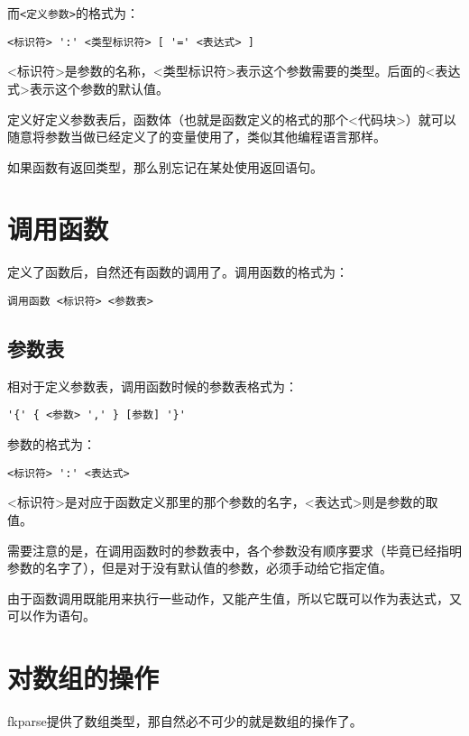 而\verb|<定义参数>|的格式为：

\begin{verbatim}
<标识符> ':' <类型标识符> [ '=' <表达式> ]
\end{verbatim}

<标识符>是参数的名称，<类型标识符>表示这个参数需要的类型。后面的<表达式>表示这个参数的默认值。

定义好定义参数表后，函数体（也就是函数定义的格式的那个<代码块>）就可以随意将参数当做已经定义了的变量使用了，类似其他编程语言那样。

如果函数有返回类型，那么别忘记在某处使用返回语句。

\section{调用函数}

定义了函数后，自然还有函数的调用了。调用函数的格式为：

\begin{verbatim}
调用函数 <标识符> <参数表>
\end{verbatim}

\subsection{参数表}

相对于定义参数表，调用函数时候的参数表格式为：

\begin{verbatim}
'{' { <参数> ',' } [参数] '}'
\end{verbatim}

参数的格式为：

\begin{verbatim}
<标识符> ':' <表达式>
\end{verbatim}

<标识符>是对应于函数定义那里的那个参数的名字，<表达式>则是参数的取值。

需要注意的是，在调用函数时的参数表中，各个参数没有顺序要求（毕竟已经指明参数的名字了），但是对于没有默认值的参数，必须手动给它指定值。

由于函数调用既能用来执行一些动作，又能产生值，所以它既可以作为表达式，又可以作为语句。

\section{对数组的操作}

fkparse提供了数组类型，那自然必不可少的就是数组的操作了。

